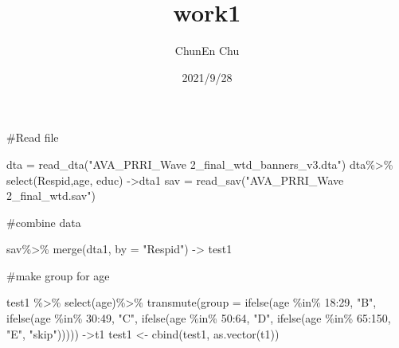 \documentclass[
]{article}
\title{work1}
\author{ChunEn Chu}
\date{2021/9/28}
\newenvironment{Shaded}{\begin{snugshade}}{\end{snugshade}}
\newcommand{\AttributeTok}[1]{\textcolor[rgb]{0.77,0.63,0.00}{#1}}
\newcommand{\DecValTok}[1]{\textcolor[rgb]{0.00,0.00,0.81}{#1}}
\newcommand{\FunctionTok}[1]{\textcolor[rgb]{0.00,0.00,0.00}{#1}}
\newcommand{\NormalTok}[1]{#1}
\newcommand{\OtherTok}[1]{\textcolor[rgb]{0.56,0.35,0.01}{#1}}
\newcommand{\SpecialCharTok}[1]{\textcolor[rgb]{0.00,0.00,0.00}{#1}}
\newcommand{\StringTok}[1]{\textcolor[rgb]{0.31,0.60,0.02}{#1}}
\begin{document}
\maketitle

\#Read file

\begin{Shaded}
\begin{Highlighting}[]
\NormalTok{dta }\OtherTok{=} \FunctionTok{read\_dta}\NormalTok{(}\StringTok{"AVA\_PRRI\_Wave 2\_final\_wtd\_banners\_v3.dta"}\NormalTok{)}
\NormalTok{dta}\SpecialCharTok{\%\textgreater{}\%}
  \FunctionTok{select}\NormalTok{(Respid,age, educ) }\OtherTok{{-}\textgreater{}}\NormalTok{dta1}
\NormalTok{sav }\OtherTok{=} \FunctionTok{read\_sav}\NormalTok{(}\StringTok{"AVA\_PRRI\_Wave 2\_final\_wtd.sav"}\NormalTok{)}
\end{Highlighting}
\end{Shaded}

\#combine data

\begin{Shaded}
\begin{Highlighting}[]
\NormalTok{sav}\SpecialCharTok{\%\textgreater{}\%}
  \FunctionTok{merge}\NormalTok{(dta1, }\AttributeTok{by =} \StringTok{"Respid"}\NormalTok{) }\OtherTok{{-}\textgreater{}}\NormalTok{ test1}
\end{Highlighting}
\end{Shaded}

\#make group for age

\begin{Shaded}
\begin{Highlighting}[]
\NormalTok{test1 }\SpecialCharTok{\%\textgreater{}\%}
  \FunctionTok{select}\NormalTok{(age)}\SpecialCharTok{\%\textgreater{}\%}
  \FunctionTok{transmute}\NormalTok{(}\AttributeTok{group =} \FunctionTok{ifelse}\NormalTok{(age }\SpecialCharTok{\%in\%} \DecValTok{18}\SpecialCharTok{:}\DecValTok{29}\NormalTok{, }\StringTok{"B"}\NormalTok{,}
         \FunctionTok{ifelse}\NormalTok{(age }\SpecialCharTok{\%in\%} \DecValTok{30}\SpecialCharTok{:}\DecValTok{49}\NormalTok{, }\StringTok{"C"}\NormalTok{, }\FunctionTok{ifelse}\NormalTok{(age }\SpecialCharTok{\%in\%} \DecValTok{50}\SpecialCharTok{:}\DecValTok{64}\NormalTok{, }
                                            \StringTok{"D"}\NormalTok{, }\FunctionTok{ifelse}\NormalTok{(age }\SpecialCharTok{\%in\%} \DecValTok{65}\SpecialCharTok{:}\DecValTok{150}\NormalTok{, }\StringTok{"E"}\NormalTok{, }\StringTok{"skip"}\NormalTok{))))) }\OtherTok{{-}\textgreater{}}\NormalTok{t1}
\NormalTok{test1 }\OtherTok{\textless{}{-}} \FunctionTok{cbind}\NormalTok{(test1, }\FunctionTok{as.vector}\NormalTok{(t1))}
\end{Highlighting}
\end{Shaded}
\end{document}
